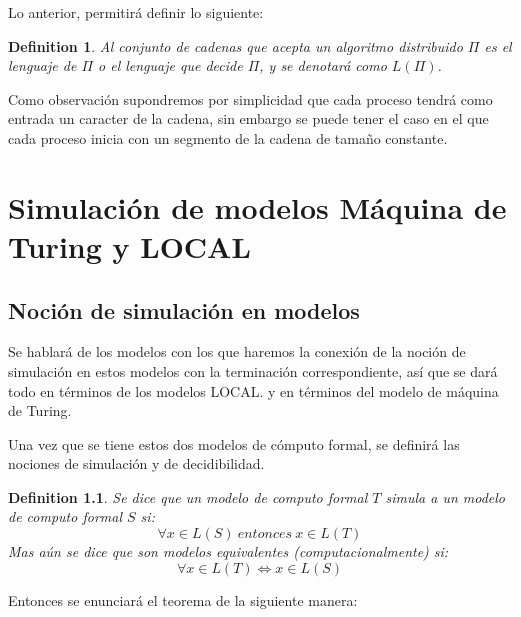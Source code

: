 \documentclass[10pt]{report}
\newtheorem{definition}{Definition}
\begin{document}
    Lo anterior, permitirá definir lo siguiente:
    \begin{definition}
        Al conjunto de cadenas que acepta un algoritmo distribuido $\Pi$ es el lenguaje
        de $\Pi$  o el lenguaje que decide $\Pi$, y se denotará como $L(\Pi)$.
    \end{definition}
    \newline

    Como observación supondremos por simplicidad que cada proceso tendrá como entrada un caracter de la cadena,
    sin embargo se puede tener el caso en el que cada proceso inicia con un segmento de la cadena de tamaño constante.

    \chapter{Simulación de modelos Máquina de Turing y \textbf{LOCAL}}
    \section{Noción de simulación en modelos}\label{sec:nocion-de-simulación-en-modelos}
    Se hablará de los modelos con los que haremos la conexión de la noción de simulación en estos modelos
    con la terminación correspondiente, así que se dará todo en términos de los modelos LOCAL. y en términos del modelo de máquina de Turing.
    
    Una vez que se tiene estos dos modelos de cómputo formal, se definirá las nociones
    de simulación y de decidibilidad.
    \theoremstyle{definition}




    \begin{definition}
        Se dice que un modelo de computo formal $T$ simula a un modelo de computo formal  $S$ si:
        \begin{equation}
        \forall x\in L(S) \ entonces \ x\in L(T)\label{eq:equation13}
        \end{equation}
        Mas aún se dice que son modelos equivalentes (computacionalmente) si:
        \begin{equation}
        \forall x\in L(T) \iff x\in L(S) \label{eq:equation14}
        \end{equation}
    \end{definition}
    \space
    Entonces se enunciará el teorema de la siguiente manera:
\end{document}
